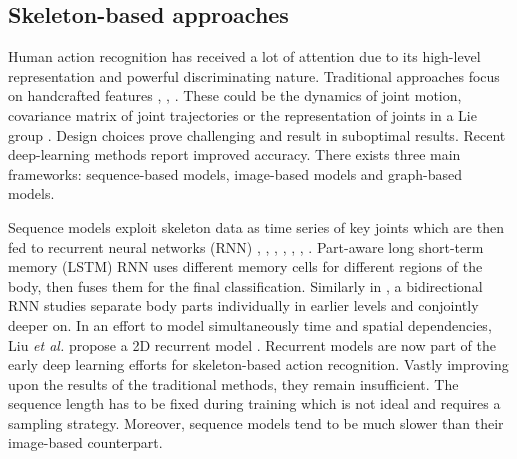 \documentclass[letterpaper, 10 pt, conference]{ieeeconf}
\begin{document}
\subsection{Skeleton-based approaches}

Human action recognition has received a lot of attention due to its high-level representation and powerful discriminating nature. Traditional approaches focus on handcrafted features \cite{hussein2013human}, \cite{vemulapalli2014human},  \cite{wang2012mining}. These could be the dynamics of joint motion, covariance matrix of joint trajectories \cite{hussein2013human} or the representation of joints in a Lie group \cite{vemulapalli2014human}. Design choices prove challenging and result in suboptimal results. Recent deep-learning methods report improved accuracy. There exists three main frameworks: sequence-based models, image-based models and graph-based models. 

Sequence models exploit skeleton data as time series of key joints which are then fed to recurrent neural networks (RNN) \cite{du2015hierarchical}, \cite{lee2017ensemble}, \cite{liu2016spatio}, \cite{shahroudy2016ntu}, \cite{song2017end}, \cite{wang2017modeling}, \cite{zhang2017view}. Part-aware long short-term memory (LSTM) RNN \cite{shahroudy2016ntu} uses different memory cells for different regions of the body, then fuses them for the final classification. Similarly in \cite{du2015hierarchical}, a bidirectional RNN studies separate body parts individually in earlier levels and conjointly deeper on. In an effort to model simultaneously time and spatial dependencies, Liu \textit{et al.} propose a 2D recurrent model \cite{liu2016spatio}. Recurrent models are now part of the early deep learning efforts for skeleton-based action recognition. Vastly improving upon the results of the traditional methods, they remain insufficient. The sequence length has to be fixed during training which is not ideal and requires a sampling strategy. Moreover, sequence models tend to be much slower than their image-based counterpart.
\end{document}
